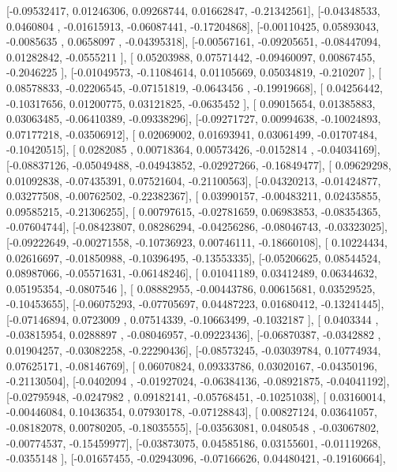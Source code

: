 \documentclass{article}
\begin{document}
       [-0.09532417,  0.01246306,  0.09268744,  0.01662847, -0.21342561],
       [-0.04348533,  0.0460804 , -0.01615913, -0.06087441, -0.17204868],
       [-0.00110425,  0.05893043, -0.0085635 ,  0.0658097 , -0.04395318],
       [-0.00567161, -0.09205651, -0.08447094,  0.01282842, -0.0555211 ],
       [ 0.05203988,  0.07571442, -0.09460097,  0.00867455, -0.2046225 ],
       [-0.01049573, -0.11084614,  0.01105669,  0.05034819, -0.210207  ],
       [ 0.08578833, -0.02206545, -0.07151819, -0.0643456 , -0.19919668],
       [ 0.04256442, -0.10317656,  0.01200775,  0.03121825, -0.0635452 ],
       [ 0.09015654,  0.01385883,  0.03063485, -0.06410389, -0.09338296],
       [-0.09271727,  0.00994638, -0.10024893,  0.07177218, -0.03506912],
       [ 0.02069002,  0.01693941,  0.03061499, -0.01707484, -0.10420515],
       [ 0.0282085 ,  0.00718364,  0.00573426, -0.0152814 , -0.04034169],
       [-0.08837126, -0.05049488, -0.04943852, -0.02927266, -0.16849477],
       [ 0.09629298,  0.01092838, -0.07435391,  0.07521604, -0.21100563],
       [-0.04320213, -0.01424877,  0.03277508, -0.00762502, -0.22382367],
       [ 0.03990157, -0.00483211,  0.02435855,  0.09585215, -0.21306255],
       [ 0.00797615, -0.02781659,  0.06983853, -0.08354365, -0.07604744],
       [-0.08423807,  0.08286294, -0.04256286, -0.08046743, -0.03323025],
       [-0.09222649, -0.00271558, -0.10736923,  0.00746111, -0.18660108],
       [ 0.10224434,  0.02616697, -0.01850988, -0.10396495, -0.13553335],
       [-0.05206625,  0.08544524,  0.08987066, -0.05571631, -0.06148246],
       [ 0.01041189,  0.03412489,  0.06344632,  0.05195354, -0.0807546 ],
       [ 0.08882955, -0.00443786,  0.00615681,  0.03529525, -0.10453655],
       [-0.06075293, -0.07705697,  0.04487223,  0.01680412, -0.13241445],
       [-0.07146894,  0.0723009 ,  0.07514339, -0.10663499, -0.1032187 ],
       [ 0.0403344 , -0.03815954,  0.0288897 , -0.08046957, -0.09223436],
       [-0.06870387, -0.0342882 ,  0.01904257, -0.03082258, -0.22290436],
       [-0.08573245, -0.03039784,  0.10774934,  0.07625171, -0.08146769],
       [ 0.06070824,  0.09333786,  0.03020167, -0.04350196, -0.21130504],
       [-0.0402094 , -0.01927024, -0.06384136, -0.08921875, -0.04041192],
       [-0.02795948, -0.0247982 ,  0.09182141, -0.05768451, -0.10251038],
       [ 0.03160014, -0.00446084,  0.10436354,  0.07930178, -0.07128843],
       [ 0.00827124,  0.03641057, -0.08182078,  0.00780205, -0.18035555],
       [-0.03563081,  0.0480548 , -0.03067802, -0.00774537, -0.15459977],
       [-0.03873075,  0.04585186,  0.03155601, -0.01119268, -0.0355148 ],
       [-0.01657455, -0.02943096, -0.07166626,  0.04480421, -0.19160664],
\end{document}
